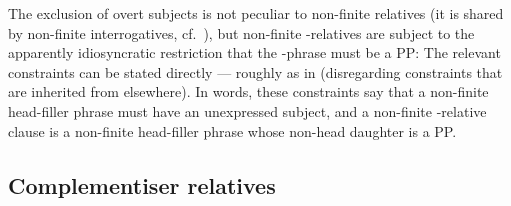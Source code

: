 \documentclass[output=paper
 	        ,biblatex
                ,babelshorthands
                ,newtxmath
                ,draftmode
                ,colorlinks, citecolor=brown
]{langscibook}
\begin{document}
The exclusion of overt subjects is not peculiar to non-finite relatives (it is shared by
non-finite interrogatives, cf.\ ), but non-finite -relatives are subject to the apparently
idiosyncratic restriction that the -phrase must be a PP:
\eal
\zl
The relevant constraints can be stated directly --- roughly as in 
(disregarding constraints that are inherited from elsewhere). In words, these constraints say that a non-finite
head-filler phrase must have an unexpressed subject, and a non-finite -relative
clause is a non-finite head-filler phrase whose non-head daughter is a PP.
\eal
\label{x:rc-55}
\ex {}
\ex\label{x:rc-56}
\zl
{}

\subsection{Complementiser relatives}
\label{sec:rc-comp-relatives}
\end{document}
